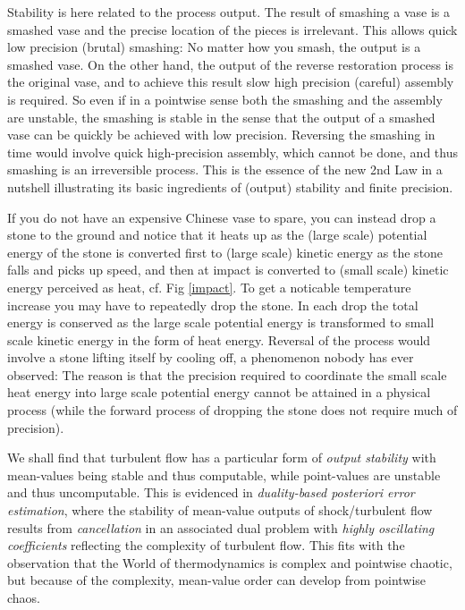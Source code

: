 Stability is here related
to the process output. The result of smashing a vase is a smashed vase
and the precise location of the pieces is irrelevant. This allows
quick low precision (brutal) smashing: No matter how you smash, the output is a
smashed vase. On the other hand, the output of the 
reverse restoration process is the original vase, 
and to achieve this result slow high precision (careful) assembly is required. 
So even if in a pointwise sense
both the smashing and the assembly are unstable, the smashing is stable
in the sense that the output of a smashed vase can be quickly be
achieved with low precision. Reversing the smashing in time would 
involve quick high-precision assembly, which cannot be done, and
thus smashing is an irreversible process. This is the essence
of the new 2nd Law in a nutshell illustrating its basic 
ingredients of (output) stability and 
finite precision.

If you do not have an expensive Chinese vase to spare, you can
instead drop a stone to the ground and notice
that it heats up as the (large scale) potential energy of the stone
is converted first to (large scale) kinetic energy as the stone falls
and picks up speed,
and then at impact is converted to (small scale) kinetic energy
perceived as heat, cf. Fig \ref{impact}. 
To get a noticable temperature increase you 
may have to repeatedly drop the stone. In each drop the total
energy is conserved as the large scale potential energy is 
transformed to small scale kinetic energy in the form of heat
energy. Reversal of the process would
involve a stone lifting itself by cooling off, a phenomenon
nobody has ever observed: The reason is that the precision
required to coordinate the small scale heat energy 
into large scale potential energy cannot be attained in a physical
process (while the forward process of dropping the stone does not 
require much of precision).

 
We shall find that turbulent flow has a particular form of
\emph{output stability} with mean-values being stable and
thus computable, while point-values are unstable and thus uncomputable.
This is evidenced in \emph{duality-based posteriori error estimation},
where the stability
of mean-value outputs of shock/turbulent flow results from
\emph{cancellation} in an associated dual problem with 
\emph{highly oscillating coefficients} reflecting the complexity of turbulent 
flow. This fits with the observation that the World 
of thermodynamics is complex and pointwise chaotic, but
because of the complexity, mean-value order can develop from 
pointwise chaos. 

